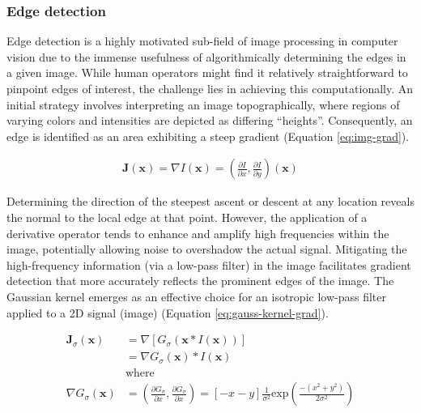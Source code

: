 \subsubsection{Edge detection}
Edge detection is a highly motivated sub-field of image processing in computer vision due to the immense usefulness of algorithmically determining the edges in a given image.
While human operators might find it relatively straightforward to pinpoint edges of interest, the challenge lies in achieving this computationally.
An initial strategy involves interpreting an image topographically, where regions of varying colors and intensities are depicted as differing ``heights''.
Consequently, an edge is identified as an area exhibiting a steep gradient (Equation \ref{eq:img-grad}).

\begin{equation}
    \begin{aligned}
        \mathbf{J}(\mathbf{x}) = \nabla I(\mathbf{x}) = (\frac{\partial I}{\partial x}, \frac{\partial I}{\partial y})(\mathbf{x})
    \end{aligned}
    \label{eq:img-grad}
\end{equation}

Determining the direction of the steepest ascent or descent at any location reveals the normal to the local edge at that point.
However, the application of a derivative operator tends to enhance and amplify high frequencies within the image, potentially allowing noise to overshadow the actual signal.
Mitigating the high-frequency information (via a low-pass filter) in the image facilitates gradient detection that more accurately reflects the prominent edges of the image.
The Gaussian kernel emerges as an effective choice for an isotropic low-pass filter applied to a 2D signal (image) (Equation \ref{eq:gauss-kernel-grad}).

\begin{equation}
    \begin{aligned}
        \mathbf{J}_{\sigma}(\mathbf{x}) &= \nabla [G_\sigma (\mathbf{x} * I(\mathbf{x}))] \\
        &= \nabla G_\sigma (\mathbf{x}) * I(\mathbf{x}) \\
        &\text{where} \\
        \nabla G_\sigma (\mathbf{x}) &= (\frac{\partial G_{\sigma}}{\partial x}, \frac{\partial G_{\sigma}}{\partial x}) = [-x - y]\frac{1}{\sigma^{2}}\text{exp}(\frac{-(x^2 + y^2)}{2 \sigma^2})
    \end{aligned}
    \label{eq:gauss-kernel-grad}
\end{equation}


